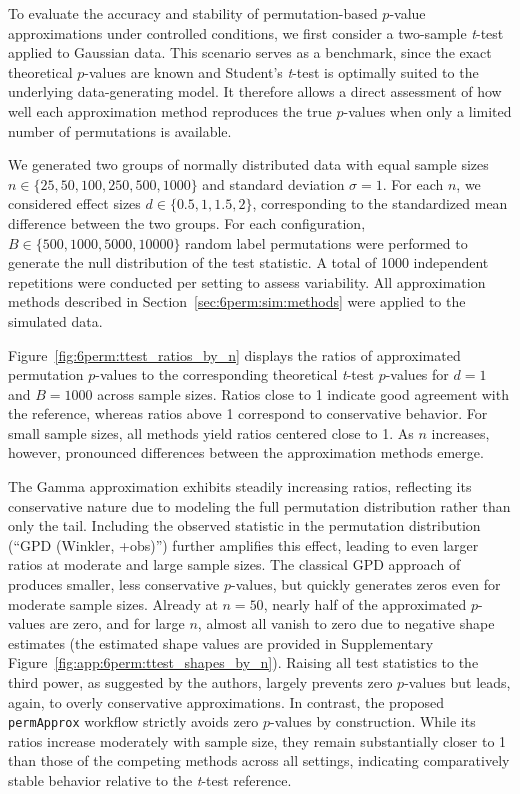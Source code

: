 To evaluate the accuracy and stability of permutation-based $p$-value approximations under controlled conditions, we first consider a two-sample \textit{t}-test applied to Gaussian data. 
This scenario serves as a benchmark, since the exact theoretical $p$-values are known and Student's \textit{t}-test is optimally suited to the underlying data-generating model. 
It therefore allows a direct assessment of how well each approximation method reproduces the true $p$-values when only a limited number of permutations is available.

We generated two groups of normally distributed data with equal sample sizes $n \in \{25, 50, 100, 250, 500, 1000\}$ and standard deviation $\sigma = 1$. 
For each $n$, we considered effect sizes $d \in \{0.5, 1, 1.5, 2\}$, corresponding to the standardized mean difference between the two groups. 
For each configuration, $B \in \{500, 1000, 5000, 10000\}$ random label permutations were performed to generate the null distribution of the test statistic. 
A total of 1000 independent repetitions were conducted per setting to assess variability. All approximation methods described in Section~\ref{sec:6perm:sim:methods} were applied to the simulated data. 

Figure~\ref{fig:6perm:ttest_ratios_by_n} displays the ratios of approximated permutation $p$-values to the corresponding theoretical \textit{t}-test $p$-values for $d=1$ and $B=1000$ across sample sizes. Ratios close to 1 indicate good agreement with the reference, whereas ratios above 1 correspond to conservative behavior. For small sample sizes, all methods yield ratios centered close to 1. As $n$ increases, however, pronounced differences between the approximation methods emerge.

The Gamma approximation exhibits steadily increasing ratios, reflecting its conservative nature due to modeling the full permutation distribution rather than only the tail. Including the observed statistic in the permutation distribution (``GPD (Winkler, +obs)'') further amplifies this effect, leading to even larger ratios at moderate and large sample sizes. The classical GPD approach of \citet{knijnenburg2009fewer} produces smaller, less conservative $p$-values, but quickly generates zeros even for moderate sample sizes. Already at $n=50$, nearly half of the approximated $p$-values are zero, and for large $n$, almost all vanish to zero due to negative shape estimates (the estimated shape values are provided in Supplementary Figure~\ref{fig:app:6perm:ttest_shapes_by_n}).  Raising all test statistics to the third power, as suggested by the authors, largely prevents zero $p$-values but leads, again, to overly conservative approximations. 	   
In contrast, the proposed \texttt{permApprox} workflow strictly avoids zero $p$-values by construction. While its ratios increase moderately with sample size, they remain substantially closer to 1 than those of the competing methods across all settings, indicating comparatively stable behavior relative to the \textit{t}-test reference.

